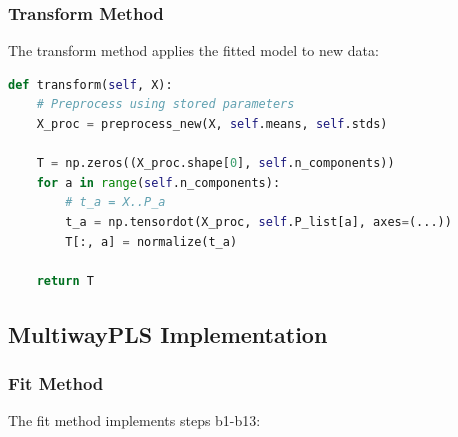 \documentclass[12pt,a4paper]{article}
\begin{document}
\subsubsection{Transform Method}

The transform method applies the fitted model to new data:

\begin{lstlisting}[language=Python, breaklines=true, basicstyle=\ttfamily\tiny]
def transform(self, X):
    # Preprocess using stored parameters
    X_proc = preprocess_new(X, self.means, self.stds)

    T = np.zeros((X_proc.shape[0], self.n_components))
    for a in range(self.n_components):
        # t_a = X..P_a
        t_a = np.tensordot(X_proc, self.P_list[a], axes=(...))
        T[:, a] = normalize(t_a)

    return T
\end{lstlisting}

\subsection{MultiwayPLS Implementation}

\subsubsection{Fit Method}

The fit method implements steps b1-b13:
\end{document}
